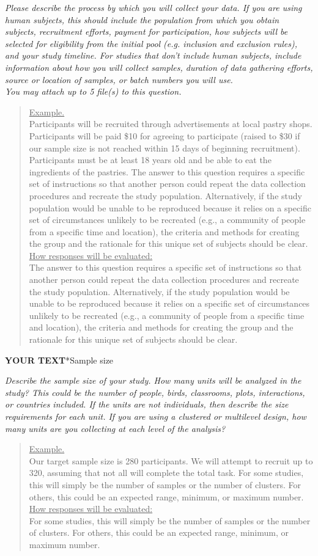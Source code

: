 \documentclass{article}
\newcommand{\example}[2]{\vspace{-0.3cm}\begin{quote}\underline{Example.}\\#1\ifx#2\undefined \else \\[0.2cm]\underline{How responses will be evaluated:}\\#2\fi\\\end{quote}}
\newcommand{\yourtext}[1]{\noindent\textbf{\color{red}YOUR TEXT}}
\begin{document}
	\textit{%
		Please describe the process by which you will collect your data. If you are using human subjects, this should include the population from which you obtain subjects, recruitment efforts, payment for participation, how subjects will be selected for eligibility from the initial pool (e.g. inclusion and exclusion rules), and your study timeline. For studies that don’t include human subjects, include information about how you will collect samples, duration of data gathering efforts, source or location of samples, or batch numbers you will use.\\
		You may attach up to 5 file(s) to this question. 
	}\\
	
	\example{
		Participants will be recruited through advertisements at local pastry shops. Participants will be paid \$10 for agreeing to participate (raised to \$30 if our sample size is not reached within 15 days of beginning recruitment). Participants must be at least 18 years old and be able to eat the ingredients of the pastries.}{		
		The answer to this question requires a specific set of instructions so that another person could repeat the data collection procedures and recreate the study population. Alternatively, if the study population would be unable to be reproduced because it relies on a specific set of circumstances unlikely to be recreated (e.g., a community of people from a specific time and location), the criteria and methods for creating the group and the rationale for this unique set of subjects should be clear.
	}
	\fi
	
	\yourtext
	
	\subsection*{Sample size}
	
	\ifx\hidehints\undefined
	
	\textit{%
		Describe the sample size of your study. How many units will be analyzed in the study? This could be the number of people, birds, classrooms, plots, interactions, or countries included. If the units are not individuals, then describe the size requirements for each unit. If you are using a clustered or multilevel design, how many units are you collecting at each level of the analysis?
	}\\
	
	\example{
		Our target sample size is 280 participants. We will attempt to recruit up to 320, assuming that not all will complete the total task.}{		
		For some studies, this will simply be the number of samples or the number of clusters. For others, this could be an expected range, minimum, or maximum number.
	}
	\fi
	
\end{document}
